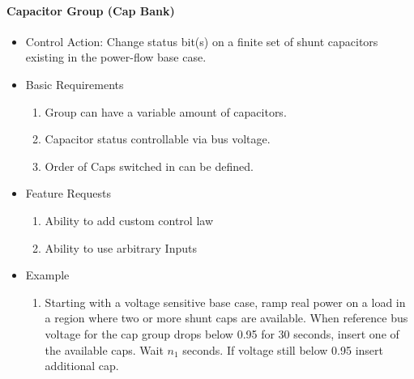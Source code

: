 \documentclass[12pt]{article}
\begin{document}
\pagebreak
\begin{multicols*}{2}
\raggedright
\paragraph{Capacitor Group (Cap Bank)}
\begin{itemize}
	\item Control Action: Change status bit(s) on a finite set of shunt capacitors existing in the power-flow base case. 
	\item Basic Requirements
	\begin{enumerate}
		\item Group can have a variable amount of capacitors.
		\item Capacitor status controllable via bus voltage.
		\item Order of Caps switched in can be defined.
	\end{enumerate}
	\item Feature Requests
	\begin{enumerate}
		\item Ability to add custom control law
		\item Ability to use arbitrary Inputs
	\end{enumerate}
	\item Example
	\begin{enumerate}
	\item Starting with a voltage sensitive base case, ramp real power on a load in a region where two or more shunt caps are available. When reference bus voltage for the cap group drops below 0.95 for 30 seconds, insert one of the available caps. Wait $n_1$ seconds. If voltage still below 0.95 insert additional cap.
	\end{enumerate}	
\end{itemize}

\vfill\null
\columnbreak


\end{multicols*}
\end{document}
